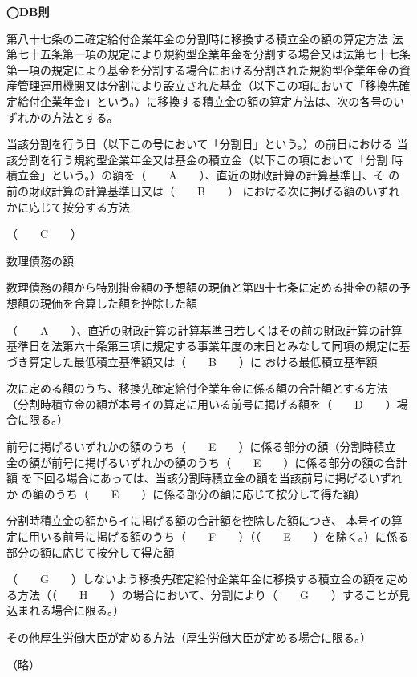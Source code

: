 \begin{fillblank}[年金2 2023 問題1(2)　\&　数理人試験 H29 問題1 設問1]
  \noindent \textbf{◯DB則}
  \begin{lawstructure}
    \begin{lawarticle}{第八十七条の二}{確定給付企業年金の分割時に移換する積立金の額の算定方法}
      法第七十五条第一項の規定により規約型企業年金を分割する場合又は法第七十七条第一項の規定により基金を分割する場合における分割された規約型企業年金の資産管理運用機関又は分割により設立された基金（以下この項において「移換先確定給付企業年金」という。）に移換する積立金の額の算定方法は、次の各号のいずれかの方法とする。

      当該分割を行う日（以下この号において「分割日」という。）の前日における
      当該分割を行う規約型企業年金又は基金の積立金（以下この項において「分割
      時積立金」という。）の額を（　　A　　）、直近の財政計算の計算基準日、そ
      の前の財政計算の計算基準日又は（　　B　　）
      における次に掲げる額のいずれかに応じて按分する方法

      （　　C　　）

      数理債務の額

      数理債務の額から特別掛金額の予想額の現価と第四十七条に定める掛金の額の予想額の現価を合算した額を控除した額

      （　　A　　）、直近の財政計算の計算基準日若しくはその前の財政計算の計算
      基準日を法第六十条第三項に規定する事業年度の末日とみなして同項の規定に基
      づき算定した最低積立基準額又は（　　B　　）に
      おける最低積立基準額

      次に定める額のうち、移換先確定給付企業年金に係る額の合計額とする方法
      （分割時積立金の額が本号イの算定に用いる前号に掲げる額を（　　D　　）場合に限る。）
      
      前号に掲げるいずれかの額のうち（　　E　　）に係る部分の額（分割時積立
      金の額が前号に掲げるいずれかの額のうち（　　E　　）に係る部分の額の合計額
      を下回る場合にあっては、当該分割時積立金の額を当該前号に掲げるいずれか
      の額のうち（　　E　　）に係る部分の額に応じて按分して得た額）

      分割時積立金の額からイに掲げる額の合計額を控除した額につき、
      本号イの算定に用いる前号に掲げる額のうち（　　F　　）（（　　E　　）を除く。）に係る部分の額に応じて按分して得た額

      （　　G　　）しないよう移換先確定給付企業年金に移換する積立金の額を定める方法（（　　H　　）の場合において、分割により（　　G　　）することが見込まれる場合に限る。）

      その他厚生労働大臣が定める方法（厚生労働大臣が定める場合に限る。）

      （略）

    \end{lawarticle}
  \end{lawstructure}
\end{fillblank}

